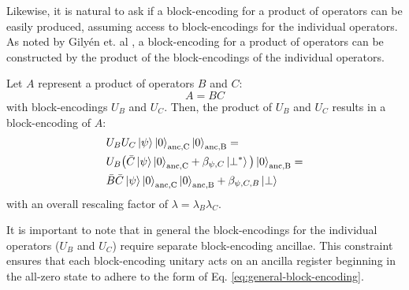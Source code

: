 Likewise, it is natural to ask if a block-encoding for a product of operators can be easily produced, assuming access to block-encodings for the individual operators.
As noted by Gilyén et. al \cite{gilyen2019quantum}, a block-encoding for a product of operators can be constructed by the product of the block-encodings of the individual operators.

Let $A$ represent a product of operators $B$ and $C$:
\begin{equation}
    \label{eq:product}
    A = BC
\end{equation}
with block-encodings $U_B$ and $U_C$.
Then, the product of $U_B$ and $U_C$ results in a block-encoding of $A$:
\begin{equation}
    \begin{split}
        &U_B U_C \ket{\psi} \ket{0}_\text{anc,C}\ket{0}_\text{anc,B} = \\
        &U_B \big(\bar{C} \ket{\psi} \ket{0}_\text{anc,C} + \beta_{\psi, C} \ket{\perp^*}\big)\ket{0}_\text{anc,B} = \\
        &\bar{B} \bar{C} \ket{\psi} \ket{0}_\text{anc,C} \ket{0}_\text{anc,B} + \beta_{\psi, C, B} \ket{\perp}
    \end{split}
\end{equation}
with an overall rescaling factor of $\lambda = \lambda_B \lambda_C$.

It is important to note that in general the block-encodings for the individual operators ($U_B$ and $U_C$) require separate block-encoding ancillae.
This constraint ensures that each block-encoding unitary acts on an ancilla register beginning in the all-zero state to adhere to the form of Eq. \ref{eq:general-block-encoding}.